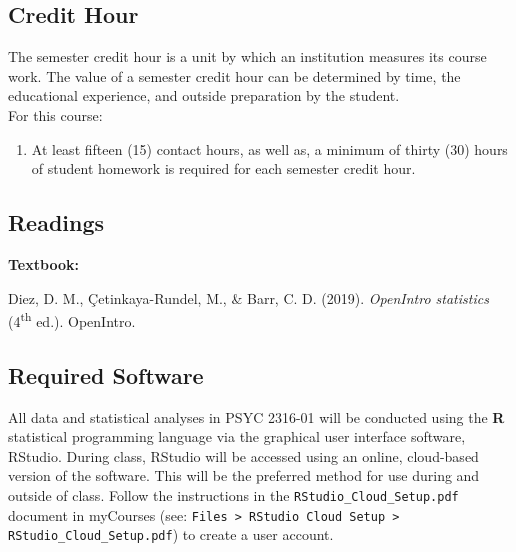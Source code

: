 \documentclass[article]{article}
\begin{document}

\subsection{Credit Hour}
The semester credit hour is a unit by which an institution measures its course work. The value of a semester credit hour can be determined by time, the educational experience, and outside preparation by the student.\\

For this course:

\begin{enumerate}
\item At least fifteen (15) contact hours, as well as, a minimum of thirty (30) hours of student homework is required for each semester credit hour.
\end{enumerate}


\subsection{Readings}


{\bf{Textbook:}}\\

\begin{hangparas}{.4in}{1}
Diez, D. M.,  \c{C}etinkaya-Rundel, M., \& Barr, C. D. (2019).  {\em{OpenIntro statistics}} (4\textsuperscript{th} ed.).  OpenIntro.
\end{hangparas}

\subsection{Required Software}

All data and statistical analyses in PSYC 2316-01 will be conducted using the \textbf{\textsf{R}} statistical programming language via the graphical user interface software, RStudio. During class, RStudio will be accessed using an online, cloud-based version of the software.  This will be the preferred method for use during and outside of class. Follow the instructions in the \texttt{RStudio\_Cloud\_Setup.pdf} document in myCourses (see: \texttt{Files > RStudio Cloud Setup > RStudio\_Cloud\_Setup.pdf}) to create a user account.
\end{document}
